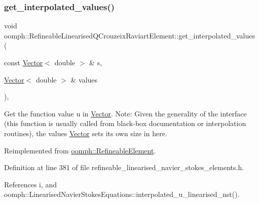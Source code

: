 \subsubsection{\texorpdfstring{get\+\_\+interpolated\+\_\+values()}{get\_interpolated\_values()}\hspace{0.1cm}{\footnotesize\ttfamily [1/2]}}
{\footnotesize\ttfamily void oomph\+::\+Refineable\+Linearised\+Q\+Crouzeix\+Raviart\+Element\+::get\+\_\+interpolated\+\_\+values (\begin{DoxyParamCaption}\item[{const \hyperlink{classoomph_1_1Vector}{Vector}$<$ double $>$ \&}]{s,  }\item[{\hyperlink{classoomph_1_1Vector}{Vector}$<$ double $>$ \&}]{values }\end{DoxyParamCaption})\hspace{0.3cm}{\ttfamily [inline]}, {\ttfamily [virtual]}}



Get the function value u in \hyperlink{classoomph_1_1Vector}{Vector}. Note\+: Given the generality of the interface (this function is usually called from black-\/box documentation or interpolation routines), the values \hyperlink{classoomph_1_1Vector}{Vector} sets its own size in here. 



Reimplemented from \hyperlink{classoomph_1_1RefineableElement_ad9a4f92880668a2373326d8306365c43}{oomph\+::\+Refineable\+Element}.



Definition at line 381 of file refineable\+\_\+linearised\+\_\+navier\+\_\+stokes\+\_\+elements.\+h.



References i, and oomph\+::\+Linearised\+Navier\+Stokes\+Equations\+::interpolated\+\_\+u\+\_\+linearised\+\_\+nst().

\mbox{\label{classoomph_1_1RefineableLinearisedQCrouzeixRaviartElement_a19d64ef35896641f1f6b8e15eb4ad606}} 
